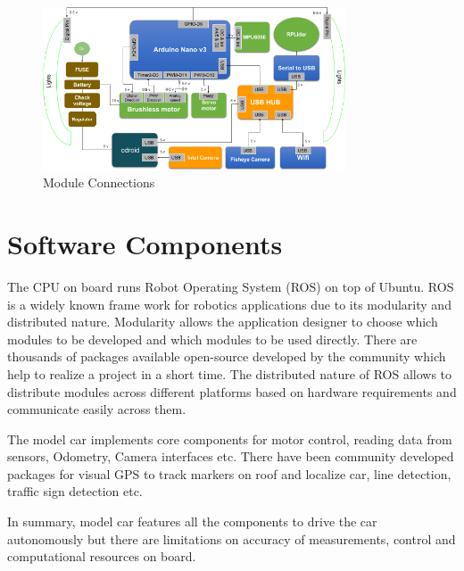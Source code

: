 \begin{figure}
	\centering
	\includegraphics[width=0.8\textwidth]{Images/platform/hardware_Connections.png}
	\caption{Module Connections}
	\label{moduleconnections}
\end{figure}

\section{Software Components}
The CPU on board runs Robot Operating System (ROS) on top of Ubuntu. ROS is a widely known frame work for robotics applications due to its modularity and distributed nature. Modularity allows the application designer to choose which modules to be developed and which modules to be used directly. There are thousands of packages available open-source developed by the community which help to realize a project in a short time. The distributed nature of ROS allows to distribute modules across different platforms based on hardware requirements and communicate easily across them.

The model car implements core components for motor control, reading data from sensors, Odometry, Camera interfaces etc. There have been community developed packages for visual GPS to track markers on roof and localize car, line detection, traffic sign detection etc. 


In summary, model car features all the components to drive the car autonomously but there are limitations on accuracy of measurements, control and computational resources on board. 

